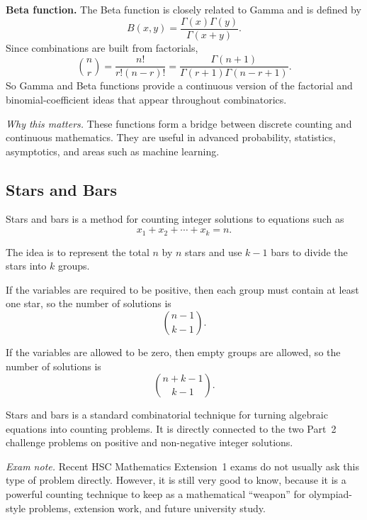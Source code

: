 \documentclass[12pt]{article}
\begin{document}
\textbf{Beta function.} The Beta function is closely related to Gamma and is defined by
\[
B(x,y)=\frac{\Gamma(x)\Gamma(y)}{\Gamma(x+y)}.
\]
Since combinations are built from factorials,
\[
\binom{n}{r}=\frac{n!}{r!(n-r)!}
=\frac{\Gamma(n+1)}{\Gamma(r+1)\Gamma(n-r+1)}.
\]
So Gamma and Beta functions provide a continuous version of the factorial and binomial-coefficient ideas that appear throughout combinatorics.

\textit{Why this matters.} These functions form a bridge between discrete counting and continuous mathematics. They are useful in advanced probability, statistics, asymptotics, and areas such as machine learning.

\subsection{Stars and Bars}
Stars and bars is a method for counting integer solutions to equations such as
\[
x_1+x_2+\cdots+x_k=n.
\]

The idea is to represent the total $n$ by $n$ stars and use $k-1$ bars to divide the stars into $k$ groups.

\begin{center}
\end{center}

If the variables are required to be positive, then each group must contain at least one star, so the number of solutions is
\[
\binom{n-1}{k-1}.
\]

If the variables are allowed to be zero, then empty groups are allowed, so the number of solutions is
\[
\binom{n+k-1}{k-1}.
\]

Stars and bars is a standard combinatorial technique for turning algebraic equations into counting problems. It is directly connected to the two Part~2 challenge problems on positive and non-negative integer solutions.

\textit{Exam note.} Recent HSC Mathematics Extension~1 exams do not usually ask this type of problem directly. However, it is still very good to know, because it is a powerful counting technique to keep as a mathematical ``weapon'' for olympiad-style problems, extension work, and future university study.
\end{document}
